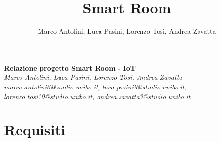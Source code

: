 \documentclass[12pt]{article}
\title{Smart Room}
\author{Marco Antolini, Luca Pasini, Lorenzo Tosi, Andrea Zavatta}
\begin{document}
\begin{center}
    \vspace*{\fill}
    \Huge\textbf{Relazione progetto Smart Room - IoT} \\
    \vspace*{\fill}
    \Large\textsl{Marco Antolini, Luca Pasini, Lorenzo Tosi, Andrea Zavatta} \\
    \vskip 1cm
    \large\textsl{marco.antolini6@studio.unibo.it, luca.pasini9@studio.unibo.it, lorenzo.tosi10@studio.unibo.it, andrea.zavatta3@studio.unibo.it}
    \vspace*{\fill}
\end{center}

\newpage

\tableofcontents
\newpage


\section{Requisiti}
\end{document}
